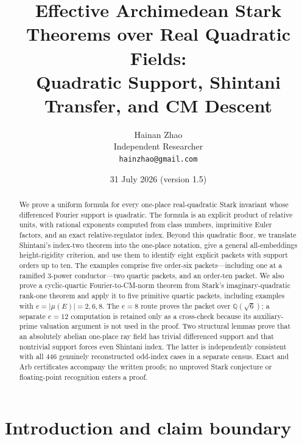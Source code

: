 \documentclass[11pt]{article}
\title{Effective Archimedean Stark Theorems over Real Quadratic Fields:\\
Quadratic Support, Shintani Transfer, and CM Descent}
\author{Hainan Zhao\\
\small Independent Researcher\\
\small\texttt{hainzhao@gmail.com}}
\date{31 July 2026 (version 1.5)}
\newcommand{\Q}{\mathbb Q}
\begin{document}
\maketitle

\begin{abstract}
We prove a uniform formula for every one-place real-quadratic Stark
invariant whose differenced Fourier support is quadratic.  The formula
is an explicit product of relative units, with rational exponents
computed from class numbers, imprimitive Euler factors, and an exact
relative-regulator index.  Beyond this quadratic floor, we translate
Shintani's index-two theorem into the one-place notation, give a
general all-embeddings height-rigidity criterion, and use them to
identify eight explicit packets with support orders up to ten.  The
examples comprise five order-six packets---including one at a
ramified \(3\)-power conductor---two quartic packets, and an
order-ten packet.  We also
prove a cyclic-quartic Fourier-to-CM-norm theorem from Stark's
imaginary-quadratic rank-one theorem and apply it to five primitive
quartic packets, including examples with
\(e=|\mu(E)|=2,6,8\).  The \(e=8\) route proves the packet over
\(\Q(\sqrt6)\); a separate \(e=12\) computation is retained only as
a cross-check because its auxiliary-prime valuation argument is not
used in the proof.  Two structural lemmas prove that an absolutely
abelian one-place ray field has trivial differenced support and that
nontrivial support forces even Shintani index.  The latter is
independently consistent with all 446 genuinely reconstructed
odd-index cases in a separate census.  Exact and Arb certificates
accompany the written proofs; no unproved Stark conjecture or
floating-point recognition enters a proof.
\end{abstract}

\section{Introduction and claim boundary}
\end{document}
